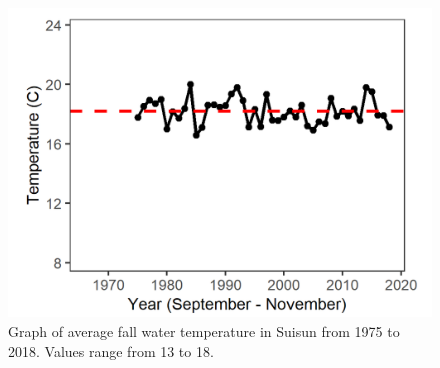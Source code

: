 \documentclass[
]{book}
\begin{document}
\begin{panel-grid}
\begin{columns-nocenter}
\begin{column800}
\begin{expand}
\end{expand}

\end{column800}

\begin{column40}

~

\end{column40}

\begin{column800}

\begin{expand}

\begin{figure}
\includegraphics[width=15.25in]{figures/temp_ssfall} \caption{Graph of average fall water temperature in Suisun from 1975 to 2018. Values range from 13 to 18.}\label{fig:unnamed-chunk-103}
\end{figure}

\end{expand}

\end{column800}

\begin{column40}

~

\end{column40}

\begin{column800}

\begin{expand}


\end{expand}
\end{column800}
\end{columns-nocenter}
\end{panel-grid}
\end{document}
